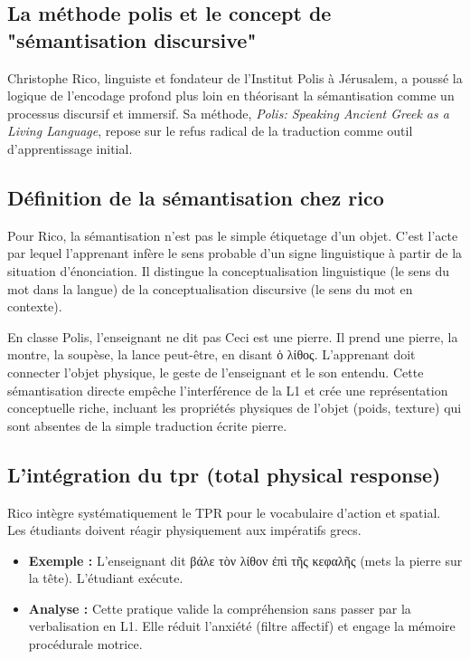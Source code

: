 \subsection{La méthode polis et le concept de "sémantisation discursive"}

Christophe Rico, linguiste et fondateur de l'Institut Polis à Jérusalem, a poussé la logique de
l'encodage profond plus loin en théorisant la \og sémantisation\fg{} comme un processus discursif et
immersif. Sa méthode, \textit{Polis: Speaking Ancient Greek as a Living Language}, repose sur le
refus radical de la traduction comme outil d'apprentissage initial.\cite{III-1-3-ref46}



\subsection{Définition de la sémantisation chez rico}

Pour Rico, la sémantisation n'est pas le simple étiquetage d'un objet. C'est l'acte par lequel
l'apprenant infère le sens probable d'un signe linguistique à partir de la situation d'énonciation.
Il distingue la conceptualisation linguistique (le sens du mot dans la langue) de la
conceptualisation discursive (le sens du mot en contexte).\cite{III-1-3-ref49}

En classe Polis, l'enseignant ne dit pas \og Ceci est une pierre\fg{}. Il prend une pierre, la
montre, la soupèse, la lance peut-être, en disant ὁ λίθος. L'apprenant doit connecter l'objet
physique, le geste de l'enseignant et le son entendu. Cette sémantisation directe empêche
l'interférence de la L1 et crée une représentation conceptuelle riche, incluant les propriétés
physiques de l'objet (poids, texture) qui sont absentes de la simple traduction écrite \og
pierre\fg{}.\cite{III-1-3-ref50}



\subsection{L'intégration du tpr (total physical response)}

Rico intègre systématiquement le TPR pour le vocabulaire d'action et spatial. Les étudiants doivent
réagir physiquement aux impératifs grecs.

\begin{itemize}\item \textbf{Exemple :} L'enseignant dit βάλε τὸν λίθον ἐπὶ τῆς κεφαλῆς (mets la pierre sur la tête). L'étudiant exécute.\item \textbf{Analyse :} Cette pratique valide la compréhension sans passer par la verbalisation en L1. Elle réduit l'anxiété (filtre affectif) et engage la mémoire procédurale motrice.\cite{III-1-3-ref50}\end{itemize}

